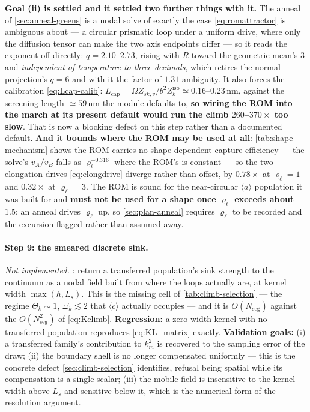 \documentclass{article}
\newcommand{\aloop}{\ensuremath{\langle a\rangle}}
\newcommand{\cloop}{\ensuremath{\langle c\rangle}}
\begin{document}
\textbf{Goal (ii) is settled and it settled two further things with it.} The
anneal of \cref{sec:anneal-greens} is a nodal solve of exactly the case
\cref{eq:romattractor} is ambiguous about --- a circular prismatic loop under a
uniform drive, where only the diffusion tensor can make the two axis endpoints
differ --- so it reads the exponent off directly: $q=2.10$--$2.73$, rising with
$R$ toward the geometric mean's $3$ and \emph{independent of temperature to three
decimals}, which retires the normal projection's $q=6$ and with it the
factor-of-$1.31$ ambiguity. It also forces the calibration
\cref{eq:Lcap-calib}: $L_{\mathrm{cap}}=\Omega Z_{sk,v}/b^{2}Z^{\mathrm{iso}}_k
\simeq0.16$--$0.23\,$nm, against the screening length $\simeq59\,$nm the module
defaults to, \textbf{so wiring the ROM into the march at its present default
would run the climb $260$--$370\times$ too slow}. That is now a blocking defect on
this step rather than a documented default. \textbf{And it bounds where the ROM
may be used at all}: \cref{tab:shape-mechanism} shows the ROM carries no
shape-dependent capture efficiency --- the solve's $v_A/v_B$ falls as
$\varrho_\ell^{-0.316}$ where the ROM's is constant --- so the two elongation
drives \cref{eq:elongdrive} diverge rather than offset, by $0.78\times$ at
$\varrho_\ell=1$ and $0.32\times$ at $\varrho_\ell=3$. The ROM is sound for the
near-circular \aloop{} population it was built for and \textbf{must not be used
for a shape once $\varrho_\ell$ exceeds about $1.5$}; an anneal drives
$\varrho_\ell$ up, so \cref{sec:plan-anneal} requires $\varrho_\ell$ to be
recorded and the excursion flagged rather than assumed away.

\paragraph{Step 9: the smeared discrete sink.} \emph{Not implemented.}
: return a transferred population's sink strength to the
continuum as a nodal field built from where the loops actually are, at kernel
width $\max(h,L_s)$. This is the missing cell of \cref{tab:climb-selection} --- the
regime $\Theta_k\sim1$, $\Xi_k\lesssim2$ that \cloop{} actually occupies --- and
it is $O(N_{\mathrm{seg}})$ against the $O(N_{\mathrm{seg}}^{2})$ of
\cref{eq:Kclimb}.
\textbf{Regression:} a zero-width kernel with no transferred population
reproduces \cref{eq:KL_matrix} exactly.
\textbf{Validation goals:} (i) a transferred family's contribution to $k^2_m$ is
recovered to the sampling error of the draw; (ii) the boundary shell is no longer
compensated uniformly --- this is the concrete defect \cref{sec:climb-selection}
identifies, refusal being spatial while its compensation is a single scalar;
(iii) the mobile field is insensitive to the kernel width above $L_s$ and
sensitive below it, which is the numerical form of the resolution argument.
\end{document}
